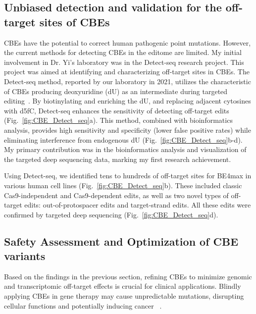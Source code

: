 \documentclass[12pt]{article}
\begin{document}
\subsection*{Unbiased detection and validation for the off-target sites of CBEs}

CBEs have the potential to correct human pathogenic point mutations\cite{komor2016programmable}. 
However, the current methods for detecting CBEs in the editome are limited. 
My initial involvement in Dr. Yi's laboratory was in the Detect-seq research project. 
This project was aimed at identifying and characterizing off-target sites in CBEs. 
The Detect-seq method, reported by our laboratory in 2021, 
utilizes the characteristic of CBEs producing deoxyuridine (dU) as an intermediate during targeted editing~\cite{lei2021detect}. 
By biotinylating and enriching the dU, and replacing adjacent cytosines with d5fC, 
Detect-seq enhances the sensitivity of detecting off-target edits (Fig.~\ref{fig:CBE_Detect_seq}a)\cite{lei2021detect}. 
This method, combined with bioinformatics analysis, 
provides high sensitivity and specificity (lower false positive rates) while eliminating interference from endogenous dU  (Fig.~\ref{fig:CBE_Detect_seq}b-d)\cite{lei2021detect,lei2022mitochondrial,lei2023detect}.  
My primary contribution was in the bioinformatics analysis and visualization of the targeted deep sequencing data, 
marking my first research achievement.  



Using Detect-seq, we identified tens to hundreds of off-target sites for BE4max in various human cell lines (Fig.~\ref{fig:CBE_Detect_seq}b).
These included classic Cas9-independent and Cas9-dependent edits, 
as well as two novel types of off-target edits: out-of-protospacer edits and target-strand edits. 
All these edits were confirmed by targeted deep sequencing (Fig.~\ref{fig:CBE_Detect_seq}d)\cite{lei2021detect}. 


  
\subsection*{Safety Assessment and Optimization of CBE variants}
Based on the findings in the previous section,
refining CBEs to minimize genomic and transcriptomic off-target effects is crucial for clinical applications. 
Blindly applying CBEs in gene therapy may cause unpredictable mutations, disrupting cellular functions and 
potentially inducing cancer ~\cite{lei2021detect,rao2023characterizing}.
\end{document}
